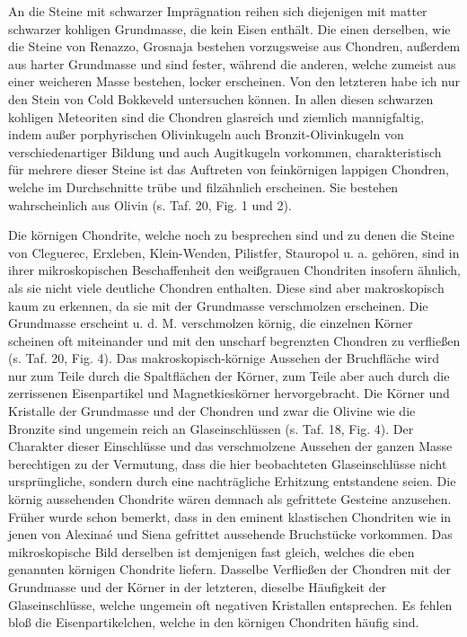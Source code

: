 \documentclass[a4paper, 11pt, oneside, polutonikogreek, german]{article}
\begin{document}
An die Steine mit schwarzer Imprägnation reihen sich diejenigen mit matter schwarzer kohligen Grundmasse, die kein Eisen enthält. Die einen derselben, wie die Steine von Renazzo, Grosnaja bestehen vorzugsweise aus Chondren, außerdem aus harter Grundmasse und sind fester, während die anderen, welche zumeist aus einer weicheren Masse bestehen, locker erscheinen. Von den letzteren habe ich nur den Stein von Cold Bokkeveld untersuchen können. In allen diesen schwarzen kohligen Meteoriten sind die Chondren glasreich und ziemlich mannigfaltig, indem außer porphyrischen Olivinkugeln auch Bronzit-Olivinkugeln von verschiedenartiger Bildung und auch Augitkugeln vorkommen, charakteristisch für mehrere dieser Steine ist das Auftreten von feinkörnigen lappigen Chondren, welche im Durchschnitte trübe und filzähnlich erscheinen. Sie bestehen wahrscheinlich aus Olivin (s. Taf. 20, Fig. 1 und 2).

Die körnigen Chondrite, welche noch zu besprechen sind und zu denen die Steine von Cleguerec, Erxleben, Klein-Wenden, Pilistfer, Stauropol u. a. gehören, sind in ihrer mikroskopischen Beschaffenheit den weißgrauen Chondriten insofern ähnlich, als sie nicht viele deutliche Chondren enthalten. Diese sind aber makroskopisch kaum zu erkennen, da sie mit der Grundmasse verschmolzen erscheinen. Die Grundmasse erscheint u. d. M. verschmolzen körnig, die einzelnen Körner scheinen oft miteinander und mit den unscharf begrenzten Chondren zu verfließen (s. Taf. 20, Fig. 4). Das makroskopisch-körnige Aussehen der Bruchfläche wird nur zum Teile durch die Spaltflächen der Körner, zum Teile aber auch durch die zerrissenen Eisenpartikel und Magnetkieskörner hervorgebracht. Die Körner und Kristalle der Grundmasse und der Chondren und zwar die Olivine wie die Bronzite sind ungemein reich an Glaseinschlüssen (s. Taf. 18, Fig. 4). Der Charakter dieser Einschlüsse und das verschmolzene Aussehen der ganzen Masse berechtigen zu der Vermutung, dass die hier beobachteten Glaseinschlüsse nicht ursprüngliche, sondern durch eine nachträgliche Erhitzung entstandene seien. Die körnig aussehenden Chondrite wären demnach als gefrittete Gesteine anzusehen. Früher wurde schon bemerkt, dass in den eminent klastischen Chondriten wie in jenen von Alexinaé und Siena gefrittet aussehende Bruchstücke vorkommen. Das mikroskopische Bild derselben ist demjenigen fast gleich, welches die eben genannten körnigen Chondrite liefern. Dasselbe Verfließen der Chondren mit der Grundmasse und der Körner in der letzteren, dieselbe Häufigkeit der Glaseinschlüsse, welche ungemein oft negativen Kristallen entsprechen. Es fehlen bloß die Eisenpartikelchen, welche in den körnigen Chondriten häufig sind.
\end{document}
